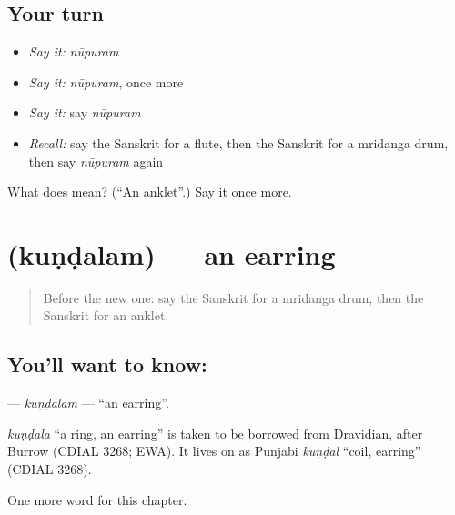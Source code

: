 \subsection*{Your turn}
\begin{itemize}
\raggedright
  \item \emph{Say it:} \emph{nūpuram}
  \item \emph{Say it:} \emph{nūpuram}, once more
  \item \emph{Say it:} say \emph{nūpuram}
  \item \emph{Recall:} say the Sanskrit for a flute, then the Sanskrit for a mridanga drum, then say \emph{nūpuram} again
\end{itemize}

\begin{tcolorbox}[breakable,colback=teal!4,colframe=teal!35!black,title={Before you move on}]
What does  mean? (\textquotedblleft{}An anklet\textquotedblright{}.) Say it once more.
\end{tcolorbox}
\section[\texorpdfstring{\sk{कुण्डलम्} (kuṇḍalam)}{कुण्डलम् (kuṇḍalam)}]{ (kuṇḍalam) — an earring}

\label{lesson:SA-C161-kundalam}



\begin{quote}
Before the new one: say the Sanskrit for a mridanga drum, then the Sanskrit for an anklet.
\end{quote}

\subsection*{You'll want to know: }
\textbf{} — \emph{kuṇḍalam} — \textquotedblleft{}an earring\textquotedblright{}.

\begin{cousinweb}
\emph{kuṇḍala} \textquotedblleft{}a ring, an earring\textquotedblright{} is taken to be borrowed from Dravidian, after Burrow (CDIAL 3268; EWA). It lives on as Punjabi \emph{kuṇḍal} \textquotedblleft{}coil, earring\textquotedblright{} (CDIAL 3268).
\end{cousinweb}

\begin{grammarlens}[title={What you've built}]
One more word for this chapter.
\end{grammarlens}

